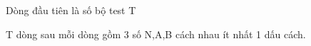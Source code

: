 Dòng đầu tiên là số bộ test T  

   T dòng sau mỗi dòng gồm 3 số N,A,B cách nhau ít nhất 1 dấu cách.  

\